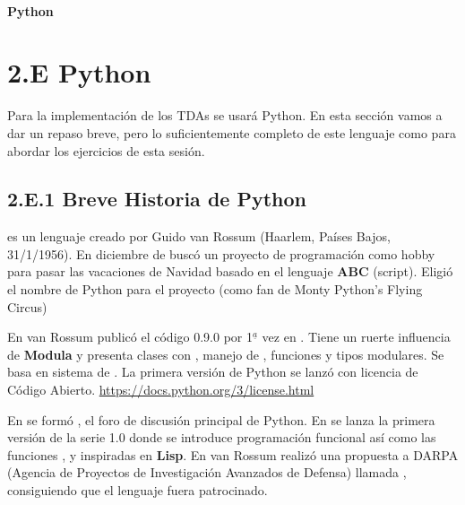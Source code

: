 

\


\centerline{\Large \bf Python}


\section*{2.E Python}


Para la implementación de los TDAs se usará Python. En esta sección vamos a dar un repaso breve, pero lo suficientemente completo de este lenguaje como para abordar los ejercicios de esta sesión.


\subsection*{2.E.1 Breve Historia de Python}





 es un lenguaje creado por Guido van Rossum (Haarlem, Países Bajos, 31/1/1956).
 En diciembre de   buscó un proyecto de programación como hobby para pasar las vacaciones de Navidad basado en el lenguaje \textbf{ABC} (script).
 Eligió el nombre de Python para el proyecto (como fan de Monty Python's Flying Circus)

En  van Rossum publicó el código 0.9.0 por 1$^{\underline{a}}$ vez en . Tiene un ruerte influencia de \textbf{Modula} y  presenta clases con , manejo de , funciones y tipos modulares. Se basa en sistema de .
La primera versión de Python se lanzó con licencia de Código Abierto. \url{https://docs.python.org/3/license.html}
 
En  se formó , el foro de discusión principal de Python. En  se lanza la primera versión de la serie 1.0 donde se introduce programación funcional así como las funciones ,  y  inspiradas en \textbf{Lisp}.
En  van Rossum realizó una propuesta a DARPA (Agencia de Proyectos de Investigación Avanzados de Defensa) llamada , consiguiendo que el lenguaje fuera patrocinado.

